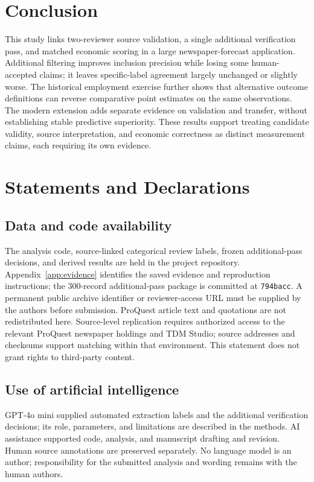 \documentclass[iicol,pdflatex,sn-mathphys-num]{sn-jnl}
\begin{document}
\section{Conclusion}
This study links two-reviewer source validation, a single additional verification pass, and matched economic scoring in a large newspaper-forecast application. Additional filtering improves inclusion precision while losing some human-accepted claims; it leaves specific-label agreement largely unchanged or slightly worse. The historical employment exercise further shows that alternative outcome definitions can reverse comparative point estimates on the same observations. The modern extension adds separate evidence on validation and transfer, without establishing stable predictive superiority. These results support treating candidate validity, source interpretation, and economic correctness as distinct measurement claims, each requiring its own evidence.

\section*{Statements and Declarations}
\subsection*{Data and code availability}
The analysis code, source-linked categorical review labels, frozen additional-pass decisions, and derived results are held in the project repository. Appendix~\ref{app:evidence} identifies the saved evidence and reproduction instructions; the 300-record additional-pass package is committed at \texttt{794bacc}. A permanent public archive identifier or reviewer-access URL must be supplied by the authors before submission. ProQuest article text and quotations are not redistributed here. Source-level replication requires authorized access to the relevant ProQuest newspaper holdings and TDM Studio; source addresses and checksums support matching within that environment. This statement does not grant rights to third-party content.

\subsection*{Use of artificial intelligence}
GPT-4o mini supplied automated extraction labels and the additional verification decisions; its role, parameters, and limitations are described in the methods. AI assistance supported code, analysis, and manuscript drafting and revision. Human source annotations are preserved separately. No language model is an author; responsibility for the submitted analysis and wording remains with the human authors.
\end{document}
